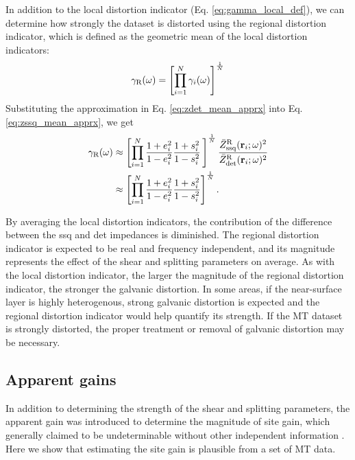 In addition to the local distortion indicator (Eq. \ref{eq:gamma_local_def}), we can determine how strongly the dataset is distorted using the regional distortion indicator, which is defined as the geometric mean of the local distortion indicators:
\begin{equation}\label{eq:gamma_regional_def}
	\gammaR\fxomega = \left[ \prod\limits_{i=1}^N \gammai\fxomega \right]^\frac{1}{N}  
\end{equation}
Substituting the approximation in Eq. \eqref{eq:zdet_mean_apprx} into Eq. \eqref{eq:zssq_mean_apprx}, we get 
\begin{equation}
\begin{split}
	\gamma_{\text{R}}(\omega) & \approx \left[ \prod\limits_{i=1}^N \frac{1+e_i^2}{1-e_i^2} \frac{1+s_i^2}{1-s_i^2}\,  \right]^\frac{1}{N}  \frac{\bar{Z}_{\mathrm{ssq}}^{\text{R}}(\mathbf{r}_i;\omega)^2}{\bar{Z}_{\mathrm{det}}^{\text{R}}(\mathbf{r}_i;\omega)^2} \\
	& \approx \left[ \prod\limits_{i=1}^N \frac{1+e_i^2}{1-e_i^2} \frac{1+s_i^2}{1-s_i^2} \right]^\frac{1}{N}.
\end{split}
\end{equation}


	By averaging the local distortion indicators, the contribution of the difference between the ssq and det impedances is diminished.
	The regional distortion indicator is expected to be real and frequency independent, and its magnitude represents the effect of the shear and splitting parameters on average. 
	As with the local distortion indicator, the larger the magnitude of the regional distortion indicator, the stronger the galvanic distortion.
	In some areas, if the near-surface layer is highly heterogenous, strong galvanic distortion is expected and the regional distortion indicator would help quantify its strength.
	If the MT dataset is strongly distorted, the proper treatment or removal of galvanic distortion may be necessary.



\subsection{Apparent gains}
In addition to determining the strength of the shear and splitting parameters, the apparent gain was introduced to determine the magnitude of site gain, which generally claimed to be undeterminable without other independent information \citep{groom1993a, bibby2005a}.  
%
Here we show that estimating the site gain is plausible from a set of MT data.

